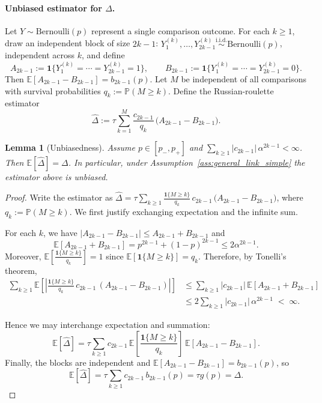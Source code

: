 \documentclass[11pt]{article}
\theoremstyle{plain}
\newtheorem{lemma}[theorem]{Lemma}
\theoremstyle{remark}
\newcommand{\E}{\mathbb{E}}
\newcommand{\Prob}{\mathbb{P}}
\newcommand{\1}{\mathbf{1}}
\begin{document}
\paragraph{Unbiased estimator for $\Delta$.}
Let $Y\sim\mathrm{Bernoulli}(p)$ represent a single comparison outcome.
For each $k\ge1$, draw an independent block of size $2k-1$:
$Y^{(k)}_1,\dots,Y^{(k)}_{2k-1}\stackrel{\mathrm{i.i.d.}}{\sim}\mathrm{Bernoulli}(p)$,
independent across $k$, and define
\[
A_{2k-1}:=\1\{Y^{(k)}_1=\cdots=Y^{(k)}_{2k-1}=1\},
\qquad
B_{2k-1}:=\1\{Y^{(k)}_1=\cdots=Y^{(k)}_{2k-1}=0\}.
\]
Then $\E[A_{2k-1}-B_{2k-1}]=b_{2k-1}(p)$.
Let $M$ be independent of all comparisons with survival probabilities $q_k:=\Prob(M\ge k)$.
Define the Russian-roulette estimator
$$
\widehat\Delta
:=
\tau\sum_{k=1}^{M}\frac{c_{2k-1}}{q_k}\,\big(A_{2k-1}-B_{2k-1}\big).
$$
\begin{propbox}
\begin{lemma}[Unbiasedness]\label{lem:unbiased_simple}
Assume $p\in[p_-,p_+]$ and $\sum_{k\ge1}|c_{2k-1}|\,\alpha^{2k-1}<\infty$.
Then $\E[\widehat\Delta]=\Delta$.
In particular, under Assumption~\ref{ass:general_link_simple} the estimator above is unbiased.
\end{lemma}
\end{propbox}
\begin{proof}
Write the estimator as
$
\widehat\Delta
=
\tau\sum_{k\ge1}\frac{\1\{M\ge k\}}{q_k}\,c_{2k-1}\,\big(A_{2k-1}-B_{2k-1}\big)$, where $ q_k:=\Prob(M\ge k).
$
We first justify exchanging expectation and the infinite sum.

For each $k$, we have $|A_{2k-1}-B_{2k-1}|\le A_{2k-1}+B_{2k-1}$ and
$$
\E[A_{2k-1}+B_{2k-1}]=p^{2k-1}+(1-p)^{2k-1}\le 2\alpha^{2k-1}.
$$
Moreover, $\E\!\left[\frac{\1\{M\ge k\}}{q_k}\right]=1$ since $\E[\1\{M\ge k\}]=q_k$.
Therefore, by Tonelli's theorem,
\begin{align*}
\sum_{k\ge1}\E\!\left[\left|\frac{\1\{M\ge k\}}{q_k}\,c_{2k-1}\,(A_{2k-1}-B_{2k-1})\right|\right]
&\le
\sum_{k\ge1}|c_{2k-1}|\,
\E[A_{2k-1}+B_{2k-1}] \\
&\le
2\sum_{k\ge1}|c_{2k-1}|\,\alpha^{2k-1}
\;<\;\infty.
\end{align*}

Hence we may interchange expectation and summation:
\[
\E[\widehat\Delta]
=
\tau\sum_{k\ge1}c_{2k-1}\,
\E\!\left[\frac{\1\{M\ge k\}}{q_k}\right]\,
\E[A_{2k-1}-B_{2k-1}].
\]
Finally, the blocks are independent and $\E[A_{2k-1}-B_{2k-1}]=b_{2k-1}(p)$, so
\[
\E[\widehat\Delta]
=
\tau\sum_{k\ge1}c_{2k-1}\,b_{2k-1}(p)
=
\tau g(p)
=
\Delta.
\]
\end{proof}
\end{document}

